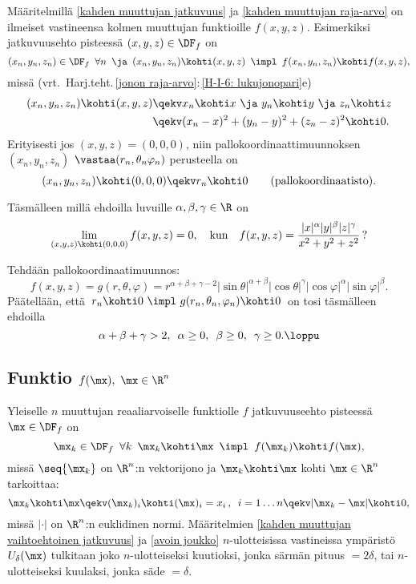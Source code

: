 Määritelmillä \ref{kahden muuttujan jatkuvuus} ja \ref{kahden muuttujan raja-arvo} on ilmeiset
vastineensa kolmen muuttujan funktioille $f(x,y,z)$. Esimerkiksi jatkuvuusehto pisteessä
$(x,y,z)\in\DF_f$ on %
\[
(x_n,y_n,z_n)\in\DF_f\,\ \forall n\,\ \ja\,\ (x_n,y_n,z_n)\kohti(x,y,z)\,\
                                      \impl\,\ f(x_n,y_n,z_n) \kohti f(x,y,z),
\]
missä (vrt.\ Harj.teht.\,\ref{jonon raja-arvo}:\,\ref{H-I-6: lukujonopari}e)
\begin{align*}
(x_n,y_n,z_n)\kohti(x,y,z) &\qekv x_n \kohti x\ \ja\ y_n \kohti y\ \ja\ z_n \kohti z \\
                           &\qekv (x_n-x)^2+(y_n-y)^2+(z_n-z)^2 \kohti 0.
\end{align*}
Erityisesti jos $(x,y,z)=(0,0,0)$, niin pallokoordinaattimuunnoksen $(x_n,y_n,z_n)$
$\vastaa(r_n,\theta_n\varphi_n)$ perusteella on
\[
(x_n,y_n,z_n)\kohti(0,0,0) \qekv r_n \kohti 0 \qquad \text{(pallokoordinaatisto)}.
\]
\begin{Exa} Täsmälleen millä ehdoilla luvuille $\alpha,\beta,\gamma\in\R$ on
\[
\lim_{(x,y,z)\kohti(0,0,0)}f(x,y,z)=0, \quad \text{kun} \quad
f(x,y,z)=\frac{|x|^\alpha|y|^\beta|z|^\gamma}{x^2+y^2+z^2}\,?
\]
\end{Exa}
\ratk Tehdään pallokoordinaatimuunnos:
\[
f(x,y,z) = g(r,\theta,\varphi) = r^{\alpha+\beta+\gamma-2}|
                                 \sin\theta|^{\alpha+\beta}|\cos\theta|^\gamma
                                 |\cos\varphi|^\alpha|\sin\varphi|^\beta.
\]
Päätellään, että $\,r_n \kohti 0\ \impl\ g(r_n,\theta_n,\varphi_n) \kohti 0\,$ on tosi
täsmälleen ehdoilla
\[
\alpha+\beta+\gamma > 2,\,\ \alpha \ge 0,\,\ \beta \ge 0,\,\ \gamma \ge 0. \loppu
\]

\subsection*{Funktio $f(\mx),\  \mx\in\R^n$}

Yleiselle $n$ muuttujan reaaliarvoiselle funktiolle $f$ jatkuvuuseehto pisteessä
$\mx\in\DF_f$ on
%
\[
\mx_k\in\DF_f\,\ \forall k\,\ \mx_k \kohti \mx\,\ \impl\,\ f(\mx_k) \kohti f(\mx),
\]
missä $\seq{\mx_k}$ on $\R^n$:n vektorijono ja \kor{suppeneminen} $\mx_k \kohti \mx$ kohti
\kor{raja-arvoa} $\mx\in\R^n$ tarkoittaa:
\[
\mx_k \kohti \mx \qekv (\mx_k)_i \kohti (\mx)_i=x_i\,,\,\ i=1 \ldots n
                 \qekv |\mx_k-\mx| \kohti 0,
\]
missä $|\cdot|$ on $\R^n$:n euklidinen normi. Määritelmien
\ref{kahden muuttujan vaihtoehtoinen jatkuvuus} ja \ref{avoin joukko} $n$-ulotteisissa
vastineissa ympäristö $U_\delta(\mx)$ tulkitaan joko $n$-ulotteiseksi kuutioksi, jonka särmän
pituus $=2\delta$, tai $n$-ulotteiseksi kuulaksi, jonka säde $=\delta$.

